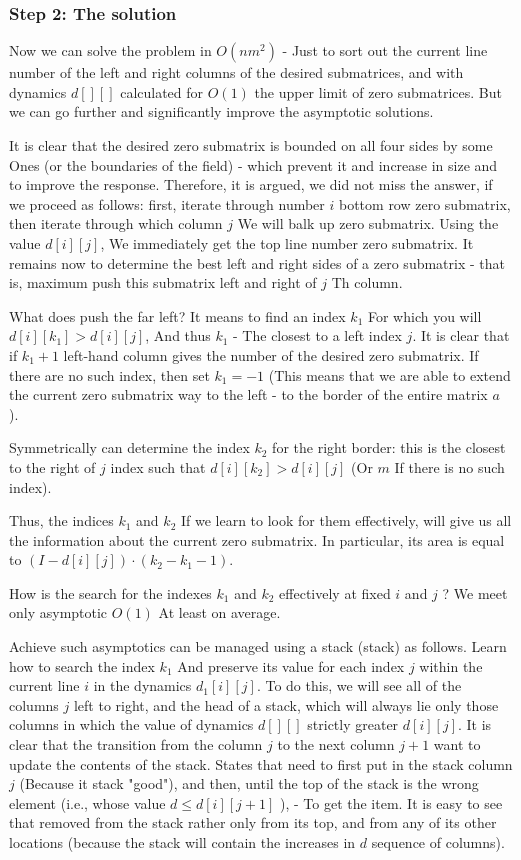 \subsubsection{ Step 2: The solution }

Now we can solve the problem in $O (n m ^ 2)$ - Just to sort out the current line number of the left and right columns of the desired submatrices, and with dynamics $d [][]$ calculated for $O (1)$ the upper limit of zero submatrices. But we can go further and significantly improve the asymptotic solutions.

It is clear that the desired zero submatrix is ​​bounded on all four sides by some Ones (or the boundaries of the field) - which prevent it and increase in size and to improve the response. Therefore, it is argued, we did not miss the answer, if we proceed as follows: first, iterate through number $i$ bottom row zero submatrix, then iterate through which column $j$ We will balk up zero submatrix. Using the value $d [i][j]$, We immediately get the top line number zero submatrix. It remains now to determine the best left and right sides of a zero submatrix - that is, maximum push this submatrix left and right of $j$ Th column.

What does push the far left? It means to find an index $k_1$ For which you will $d [i][k_1]> d [i][j]$, And thus $k_1$ - The closest to a left index $j$. It is clear that if $k_1 +1$ left-hand column gives the number of the desired zero submatrix. If there are no such index, then set $k_1 = -1$ (This means that we are able to extend the current zero submatrix way to the left - to the border of the entire matrix $a$ ).

Symmetrically can determine the index $k_2$ for the right border: this is the closest to the right of $j$ index such that $d [i][k_2]> d [i][j]$ (Or $m$ If there is no such index).

Thus, the indices $k_1$ and $k_2$ If we learn to look for them effectively, will give us all the information about the current zero submatrix. In particular, its area is equal to $(I - d [i][j]) \cdot (k_2 - k_1 - 1)$.

How is the search for the indexes $k_1$ and $k_2$ effectively at fixed $i$ and $j$ ? We meet only asymptotic $O (1)$ At least on average.

Achieve such asymptotics can be managed using a stack (stack) as follows. Learn how to search the index $k_1$ And preserve its value for each index $j$ within the current line $i$ in the dynamics $d_1 [i][j]$. To do this, we will see all of the columns $j$ left to right, and the head of a stack, which will always lie only those columns in which the value of dynamics $d [][]$ strictly greater $d [i][j]$. It is clear that the transition from the column $j$ to the next column $j +1$ want to update the contents of the stack. States that need to first put in the stack column $j$ (Because it stack "good"), and then, until the top of the stack is the wrong element (i.e., whose value $d \le d [i][j +1]$ ), - To get the item. It is easy to see that removed from the stack rather only from its top, and from any of its other locations (because the stack will contain the increases in $d$ sequence of columns).

